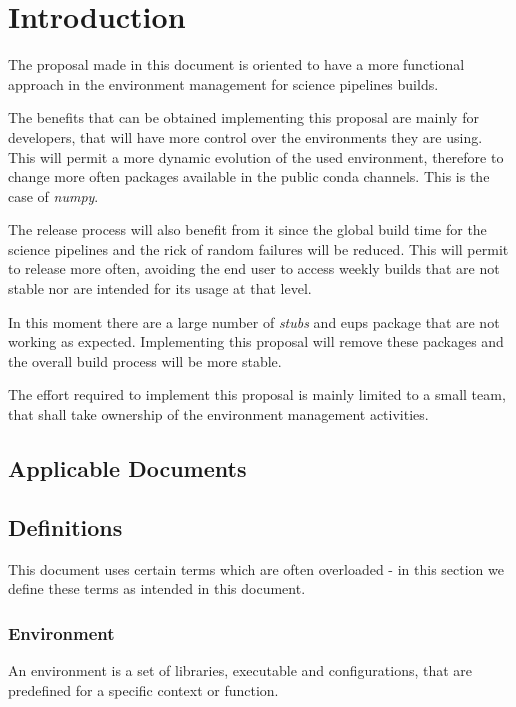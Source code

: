 \section{Introduction} \label{sec:intro}

The proposal made in this document is oriented to have a more functional approach in the environment management for science pipelines builds.

The benefits that can be obtained implementing this proposal are mainly for developers, that will have more control over the environments they are using. 
This will permit a more dynamic evolution of the used environment, therefore to change more often packages available in the public conda channels. This is the case of \textit{numpy}.

The release process will also benefit from it since the global build time for the science pipelines and the rick of random failures will be reduced.
This will permit to release more often, avoiding the end user to access weekly builds that are not stable nor are intended for its usage at that level.

In this moment there are a large number of \textit{stubs} and eups package that are not working as expected.
Implementing this proposal will remove these packages and the overall build process will be more stable.

The effort required to implement this proposal is mainly limited to a small team, that shall take ownership of the environment management activities.


\subsection{Applicable Documents}


\subsection{Definitions}

This document uses certain terms which are often overloaded -  in this section we define these terms  as intended in this document.

\subsubsection{Environment} \label{sec:envdef}

An environment is a set of libraries, executable and configurations, that are predefined for a specific context or function.

